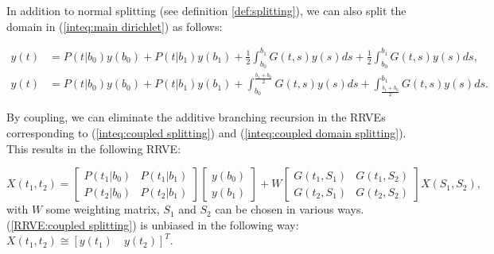 \documentclass[a4paper,12pt]{article}
\begin{document}
\begin{example} \label{ex:coupled splitting}
    In addition to normal splitting (see definition \ref{def:splitting}),
    we can also split the domain in (\ref{inteq:main dirichlet})
    as follows:

    \begin{align}\label{inteq:coupled splitting}
        y(t) & = P(t|b_{0}) y(b_{0}) + P(t|b_{1}) y(b_{1}) +
        \frac{1}{2} \int_{b_{0}}^{b_{1}} G(t,s)y(s) ds +
        \frac{1}{2} \int_{b_{0}}^{b_{1}} G(t,s)y(s) ds,                                             \\
        y(t) & = P(t|b_{0}) y(b_{0}) + P(t|b_{1}) y(b_{1}) + \label{inteq:coupled domain splitting}
        \int_{b_{0}}^{\frac{b_{1}+b_{0}}{2}} G(t,s)y(s) ds +
        \int_{\frac{b_{1}+b_{0}}{2}}^{b_{1}} G(t,s)y(s) ds.
    \end{align}

    By coupling, we can eliminate the additive branching recursion
    in the RRVEs corresponding to (\ref{inteq:coupled splitting})
    and (\ref{inteq:coupled domain splitting}).
    This results in the following RRVE:

    \begin{equation} \label{RRVE:coupled splitting}
        X(t_{1},t_{2})=
        \begin{bmatrix}
            P(t_{1}|b_{0}) & P(t_{1}|b_{1}) \\
            P(t_{2}|b_{0}) & P(t_{2}|b_{1})
        \end{bmatrix}
        \begin{bmatrix}
            y(b_{0}) \\
            y(b_{1})
        \end{bmatrix}
        +
        W
        \begin{bmatrix}
            G(t_{1},S_{1}) & G(t_{1},S_{2}) \\
            G(t_{2},S_{1}) & G(t_{2},S_{2})
        \end{bmatrix}
        X(S_{1},S_{2}),
    \end{equation}
    with $W$ some weighting matrix,
    $S_{1}$ and $S_{2}$ can be chosen
    in various ways. (\ref{RRVE:coupled splitting}) is unbiased in the following way:
    $X(t_{1},t_{2}) \cong [y(t_{1}) \quad y(t_{2})]^{T}$.

\end{example}
\end{document}
